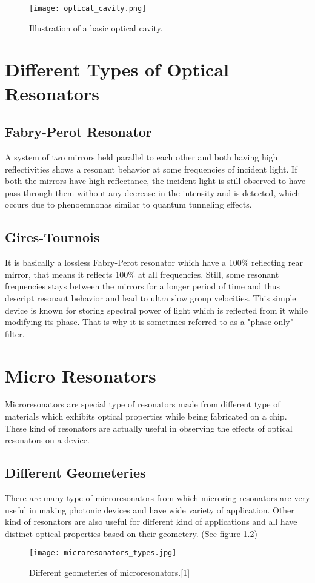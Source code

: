 \begin{figure}[h]
\centering
\texttt{[image: optical\_cavity.png]}
\caption{Illustration of a basic optical cavity.}
\end{figure}

\newpage
\section{Different Types of Optical Resonators}
\subsection{Fabry-Perot Resonator}
A system of two mirrors held parallel to each other and both having high reflectivities shows a resonant behavior at some frequencies of incident light. If both the mirrors have high reflectance, the incident light is still observed to have pass through them without any decrease in the intensity and is detected, which occurs due to phenoemnonas similar to quantum tunneling effects.

\subsection{Gires-Tournois}
It is basically a lossless Fabry-Perot resonator which have a 100$\%$ reflecting rear mirror, that means it reflects 100$\%$ at all frequencies. Still, some resonant frequencies stays between the mirrors for a longer period of time and thus descript resonant behavior and lead to ultra slow group velocities. This simple device is known for storing spectral power of light which is reflected from it while modifying its phase. That is why it is sometimes referred to as a "phase only" filter.


\section{Micro Resonators}
Microresonators are special type of resonators made from different type of materials which exhibits optical properties while being fabricated on a chip. These kind of resonators are actually useful in observing the effects of optical resonators on a device.
\subsection{Different Geometeries}
There are many type of microresonators from which microring-resonators are very useful in making photonic devices and have wide variety of application. Other kind of resonators are also useful for different kind of applications and all have distinct optical properties based on their geometery. (See figure 1.2)
\begin{figure}[h]
\centering
\texttt{[image: microresonators\_types.jpg]}
\caption{Different geometeries of microresonators.[1]}
\end{figure}


